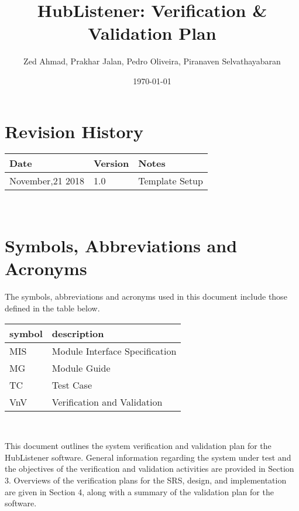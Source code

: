 \documentclass[12pt, titlepage]{article}
\begin{document}
\title{HubListener: Verification \& Validation Plan} 
\author{Zed Ahmad, Prakhar Jalan, Pedro Oliveira, Piranaven Selvathayabaran}
\date{\today}
	
\maketitle


\section{Revision History}

\begin{tabularx}{\textwidth}{p{3cm}p{2cm}X}
\toprule {\bf Date} & {\bf Version} & {\bf Notes}\\
\midrule
November,21 2018 & 1.0 & Template Setup\\
\bottomrule
\end{tabularx}

~\newpage

\section{Symbols, Abbreviations and Acronyms}

The symbols, abbreviations and acronyms used in this document include those defined in the table below. \newline
\renewcommand{\arraystretch}{1.2}

\begin{tabular}{l l} 
  \toprule		
  \textbf{symbol} & \textbf{description}\\
  \midrule 
  MIS & Module Interface Specification\\
  MG & Module Guide \\
  TC & Test Case \\
  VnV & Verification and Validation\\
  \bottomrule
\end{tabular}\\


\newpage

\tableofcontents

\listoftables

\newpage


This document outlines the system verification and validation plan for the HubListener software. General information regarding the system under test and the objectives of the verification and validation activities are provided in Section 3.  Overviews of the verification plans for the SRS, design, and implementation are given in Section 4, along with a summary of the validation plan for the software. 
\end{document}
